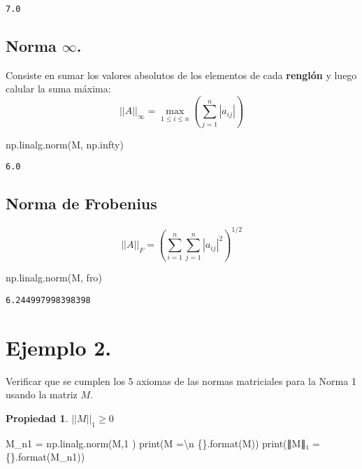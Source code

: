 \documentclass[
  letterpaper,
  DIV=11,
  numbers=noendperiod]{scrreprt}
\newenvironment{Shaded}{\begin{snugshade}}{\end{snugshade}}
\newcommand{\BuiltInTok}[1]{\textcolor[rgb]{0.00,0.23,0.31}{#1}}
\newcommand{\CharTok}[1]{\textcolor[rgb]{0.13,0.47,0.30}{#1}}
\newcommand{\DecValTok}[1]{\textcolor[rgb]{0.68,0.00,0.00}{#1}}
\newcommand{\NormalTok}[1]{\textcolor[rgb]{0.00,0.23,0.31}{#1}}
\newcommand{\OperatorTok}[1]{\textcolor[rgb]{0.37,0.37,0.37}{#1}}
\newcommand{\SpecialCharTok}[1]{\textcolor[rgb]{0.37,0.37,0.37}{#1}}
\newcommand{\StringTok}[1]{\textcolor[rgb]{0.13,0.47,0.30}{#1}}
\begin{document}
\begin{verbatim}
7.0
\end{verbatim}

\subsection{\texorpdfstring{Norma
\(\infty\).}{Norma \textbackslash infty.}}\label{norma-infty.}

Consiste en sumar los valores absolutos de los elementos de cada
\textbf{renglón} y luego calular la suma máxima: \[
||A||_\infty = \max_{1 \le i \le n} \left( \sum_{j=1}^n  |a_{ij}| \right)
\]

\begin{Shaded}
\begin{Highlighting}[]
\NormalTok{np.linalg.norm(M, np.infty)}
\end{Highlighting}
\end{Shaded}

\begin{verbatim}
6.0
\end{verbatim}

\subsection{Norma de Frobenius}\label{norma-de-frobenius}

\[
||A||_F = \left( \sum_{i=1}^n \sum_{j=1}^n |a_{ij}|^2 \right)^{1/2}
\]

\begin{Shaded}
\begin{Highlighting}[]
\NormalTok{np.linalg.norm(M, }\StringTok{\textquotesingle{}fro\textquotesingle{}}\NormalTok{)}
\end{Highlighting}
\end{Shaded}

\begin{verbatim}
6.244997998398398
\end{verbatim}

\section{\texorpdfstring{\textbf{Ejemplo
2.}}{Ejemplo 2.}}\label{ejemplo-2.-1}

Verificar que se cumplen los 5 axiomas de las normas matriciales para la
Norma 1 usando la matriz \(M\).

\textbf{Propiedad 1}. \(||M||_1 \geq 0\)

\begin{Shaded}
\begin{Highlighting}[]
\NormalTok{M\_n1 }\OperatorTok{=}\NormalTok{ np.linalg.norm(M,}\DecValTok{1}\NormalTok{ )}
\BuiltInTok{print}\NormalTok{(}\StringTok{\textquotesingle{}M =}\CharTok{\textbackslash{}n}\StringTok{ }\SpecialCharTok{\{\}}\StringTok{\textquotesingle{}}\NormalTok{.}\BuiltInTok{format}\NormalTok{(M))}
\BuiltInTok{print}\NormalTok{(}\StringTok{\textquotesingle{}∥M∥₁ = }\SpecialCharTok{\{\}}\StringTok{\textquotesingle{}}\NormalTok{.}\BuiltInTok{format}\NormalTok{(M\_n1))}
\end{Highlighting}
\end{Shaded}
\end{document}

